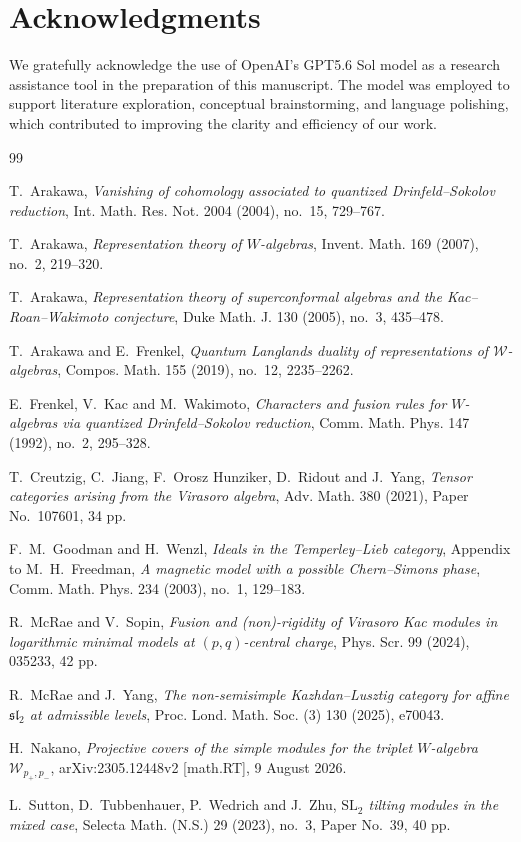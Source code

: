 \documentclass[12pt,leqno]{amsart}
\numberwithin{equation}{section}
\begin{document}
\section*{Acknowledgments}

We gratefully acknowledge the use of OpenAI's GPT5.6 Sol model as a research assistance tool in the preparation of this manuscript. The model was employed to support literature exploration, conceptual brainstorming, and language polishing, which contributed to improving the clarity and efficiency of our work.

\begin{thebibliography}{99}

T.~Arakawa,
\emph{Vanishing of cohomology associated to quantized Drinfeld--Sokolov reduction},
Int. Math. Res. Not. 2004 (2004), no.~15, 729--767.

T.~Arakawa,
\emph{Representation theory of $W$-algebras},
Invent. Math. 169 (2007), no.~2, 219--320.

T.~Arakawa,
\emph{Representation theory of superconformal algebras and the
Kac--Roan--Wakimoto conjecture},
Duke Math. J. 130 (2005), no.~3, 435--478.

T.~Arakawa and E.~Frenkel,
\emph{Quantum Langlands duality of representations of $\mathcal W$-algebras},
Compos. Math. 155 (2019), no.~12, 2235--2262.

E.~Frenkel, V.~Kac and M.~Wakimoto,
\emph{Characters and fusion rules for $W$-algebras via quantized Drinfeld--Sokolov reduction},
Comm. Math. Phys. 147 (1992), no.~2, 295--328.

T.~Creutzig, C.~Jiang, F.~Orosz Hunziker, D.~Ridout and J.~Yang,
\emph{Tensor categories arising from the Virasoro algebra},
Adv. Math. 380 (2021), Paper No.~107601, 34 pp.

F.~M.~Goodman and H.~Wenzl,
\emph{Ideals in the Temperley--Lieb category},
Appendix to M.~H.~Freedman, \emph{A magnetic model with a possible Chern--Simons phase},
Comm. Math. Phys. 234 (2003), no.~1, 129--183.

R.~McRae and V.~Sopin,
\emph{Fusion and (non)-rigidity of Virasoro Kac modules in logarithmic minimal models at $(p,q)$-central charge},
Phys. Scr. 99 (2024), 035233, 42 pp.

R.~McRae and J.~Yang,
\emph{The non-semisimple Kazhdan--Lusztig category for affine $\mathfrak{sl}_2$ at admissible levels},
Proc. Lond. Math. Soc. (3) 130 (2025), e70043.

H.~Nakano,
\emph{Projective covers of the simple modules for the triplet $W$-algebra $\mathcal W_{p_+,p_-}$},
arXiv:2305.12448v2 [math.RT], 9 August 2026.

L.~Sutton, D.~Tubbenhauer, P.~Wedrich and J.~Zhu,
\emph{$\mathrm{SL}_2$ tilting modules in the mixed case},
Selecta Math. (N.S.) 29 (2023), no.~3, Paper No.~39, 40 pp.

\end{thebibliography}
\end{document}
